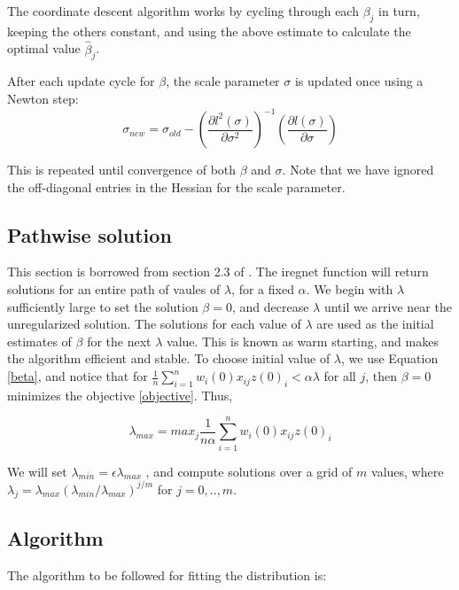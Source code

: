 \documentclass[12pt,a4paper]{report}
\begin{document}
The coordinate descent algorithm works by
cycling through each $\beta_j$ in turn, keeping the others constant, and using the above estimate to calculate the optimal value
$\hat \beta_j$.

\vspace{4mm}
After each update cycle for $\beta$, the scale parameter $\sigma$ is updated once using a Newton step:
\begin{equation}
  \sigma_{new} = \sigma_{old} - \left(\frac{\partial l^2(\sigma)}{\partial \sigma ^2} \right)^{-1}
                                \left( \frac{\partial l (\sigma)}{\partial \sigma } \right)
\end{equation}


This is repeated until convergence of both $\beta$ and $\sigma$. Note that we have ignored the off-diagonal entries in the Hessian for the scale parameter.

\subsection*{Pathwise solution}
This section is borrowed from section 2.3 of \cite{a3}.
The iregnet function will return solutions for an entire path of vaules of $\lambda$, for a fixed $\alpha$.
We begin with $\lambda$ sufficiently large to set the solution $\beta = 0$, and decrease $\lambda$ until we arrive
near the unregularized solution. The solutions for each value of $\lambda$ are used as the initial
estimates of $\beta$ for the next $\lambda$ value. This is known as warm starting, and makes the algorithm efficient and stable.
To choose initial value of $\lambda$, we use Equation \ref{beta}, and notice that for $\frac{1}{n} \sum_{i=1}^n w_i(0) x_{ij} z(0)_i < \alpha \lambda$ for all $j$, then $\beta = 0$ minimizes the objective \ref{objective}. Thus,

\begin{equation} \label{lambda}
\lambda_{max} = max_j \frac{1}{n \alpha} \sum_{i=1}^n w_i(0) x_{ij} z(0)_i
\end{equation}

We will set $\lambda_{min} = \epsilon \lambda_{max}$ , and compute solutions over a grid of $m$ values, where $\lambda_j = \lambda_{max}(\lambda_{min} / \lambda_{max})^{j/m}$ for $j = 0, .., m$.

\subsection*{Algorithm}
The algorithm to be followed for fitting the distribution is:
\end{document}
